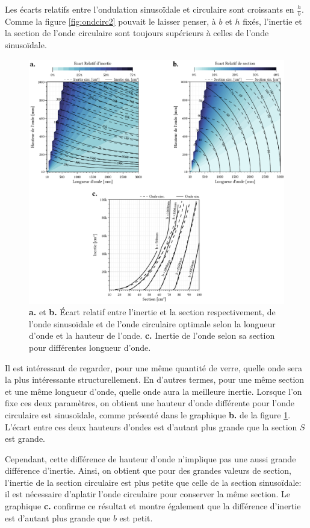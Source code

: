 \documentclass[11pt,titlepage]{article}
\begin{document}
Les écarts relatifs entre l'ondulation sinusoïdale et circulaire sont croissants en $\frac{h}{b}$. Comme la figure \ref{fig:ondcirc2} pouvait le laisser penser, à $b$ et $h$ fixés, l'inertie et la section de l'onde circulaire sont toujours supérieurs à celles de l'onde sinusoïdale. 
\begin{figure}[H]
    \centering
    \includegraphics[width=\linewidth]{img/ondul/section_circ.pdf}
    \caption{\textbf{a.} et \textbf{b.} Écart relatif entre l'inertie et la section respectivement, de l'onde sinusoïdale et de l'onde circulaire optimale selon la longueur d'onde et la hauteur de l'onde. \textbf{c.} Inertie de l'onde selon sa section pour différentes longueur d'onde.}
    \label{fig:ERcirc}
\end{figure}
Il est intéressant de regarder, pour une même quantité de verre, quelle onde sera la plus intéressante structurellement. En d'autres termes, pour une même section et une même longueur d'onde, quelle onde aura la meilleure inertie. Lorsque l'on fixe ces deux paramètres, on obtient une hauteur d'onde différente pour l'onde circulaire est sinusoïdale, comme présenté dans le graphique \textbf{b.} de la figure \ref{fig:ERcirc}. L'écart entre ces deux hauteurs d'ondes est d'autant plus grande que la section $S$ est grande.

  Cependant, cette différence de hauteur d'onde n'implique pas une aussi grande différence d'inertie. Ainsi, on obtient que pour des grandes valeurs de section, l'inertie de la section circulaire est plus petite que celle de la section sinusoïdale: il est nécessaire d'aplatir l'onde circulaire pour conserver la même section. Le graphique \textbf{c.} confirme ce résultat et montre également que la différence d'inertie est d'autant plus grande que $b$ est petit.
\end{document}
